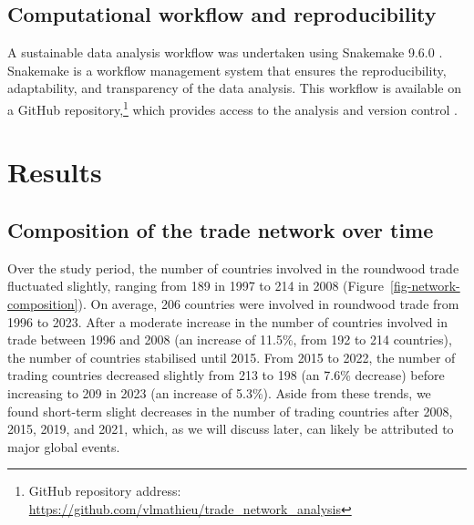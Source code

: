 \documentclass[
  authoryear,
  review,
  3p]{elsarticle}
\begin{document}
\subsection{Computational workflow and
reproducibility}\label{computational-workflow-and-reproducibility}

A sustainable data analysis workflow was undertaken using Snakemake
9.6.0 \citep{molder_sustainable_2025}. Snakemake is a workflow
management system that ensures the reproducibility, adaptability, and
transparency of the data analysis. This workflow is available on a
GitHub repository,\footnote{GitHub repository address:
  \url{https://github.com/vlmathieu/trade_network_analysis}} which
provides access to the analysis and version control
\citep{braga_not_2023}.

\section{Results}\label{results}

\subsection{Composition of the trade network over
time}\label{composition-of-the-trade-network-over-time}

Over the study period, the number of countries involved in the roundwood
trade fluctuated slightly, ranging from 189 in 1997 to 214 in 2008
(Figure~\ref{fig-network-composition}). On average, 206 countries were
involved in roundwood trade from 1996 to 2023. After a moderate increase
in the number of countries involved in trade between 1996 and 2008 (an
increase of 11.5\%, from 192 to 214 countries), the number of countries
stabilised until 2015. From 2015 to 2022, the number of trading
countries decreased slightly from 213 to 198 (an 7.6\% decrease) before
increasing to 209 in 2023 (an increase of 5.3\%). Aside from these
trends, we found short-term slight decreases in the number of trading
countries after 2008, 2015, 2019, and 2021, which, as we will discuss
later, can likely be attributed to major global events.
\end{document}
